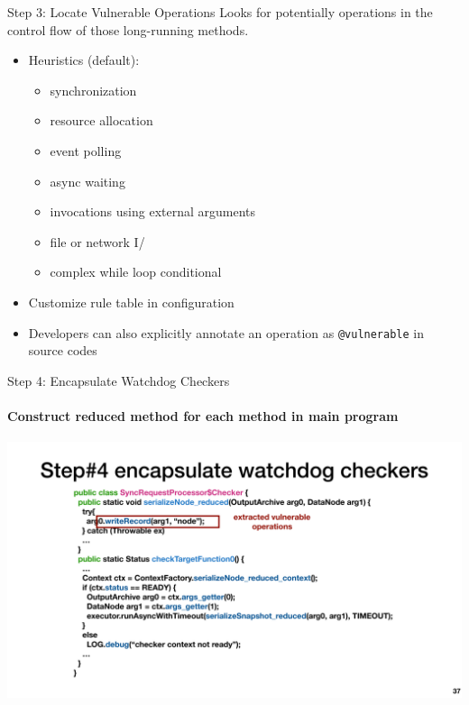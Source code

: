 \documentclass[aspectratio=169]{beamer}
\newcommand{\red}[1]{{\color{red}{#1}}}
\begin{document}
\begin{frame}{Step 3: Locate Vulnerable Operations}
    Looks for potentially \red{vulnerable} operations in the control flow of those long-running methods.

    \begin{itemize}
        \item Heuristics (default):
        \begin{itemize}
            \item synchronization
            \item resource allocation
            \item event polling
            \item async waiting
            \item invocations using external arguments
            \item file or network I/
            \item complex while loop conditional
        \end{itemize}
        \item Customize rule table in configuration
        \item Developers can also explicitly annotate an operation as \texttt{@vulnerable} in source codes
    \end{itemize}
\end{frame}

\begin{frame}{Step 4: Encapsulate Watchdog Checkers}
    \framesubtitle{Construct reduced method for each \red{vulnerable} method in main program}
    \begin{center}
        \includegraphics[width=.85\textwidth]{fig/encapsulate}
    \end{center}
\end{frame}
\end{document}
